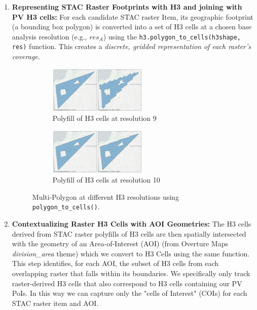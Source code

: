 \begin{enumerate}
    \item \textbf{Representing STAC Raster Footprints with H3 and joining with PV H3 cells:}
        For each candidate STAC raster Item, its geographic footprint (a bounding box polygon) is converted into a set of H3 cells at a chosen base analysis resolution (e.g., $res_A$) using the \texttt{h3.polygon\_to\_cells(h3shape, res)} function. 
        This creates a \textit{discrete, gridded representation of each raster's coverage}.

    \begin{figure}[htpb]
        \centering
        \begin{subfigure}{\textwidth}
            \centering
            \includegraphics[width=0.55\textwidth]{report/assets/figures/h3_polygonToCells_example_res9.png}
            \caption{Polyfill of H3 cells at resolution 9}
        \end{subfigure}
        
        \begin{subfigure}{\textwidth}
            \centering
            \includegraphics[width=0.55\textwidth]{report/assets/figures/h3_polygonToCells_example_res10.png}
            \caption{Polyfill of H3 cells at resolution 10}
        \end{subfigure}
        \caption{Multi-Polygon at different H3 resolutions using \texttt{polygon\_to\_cells()}.}
    \end{figure}

    \item \textbf{Contextualizing Raster H3 Cells with AOI Geometries:}
        The H3 cells derived from STAC raster polyfills of H3 cells are then spatially intersected with the geometry of an Area-of-Interest (AOI) (from Overture Maps \textit{division\_area} theme) which we convert to H3 Cells using the same function. 
        This step identifies, for each AOI, the subset of H3 cells from each overlapping raster that falls within its boundaries. We specifically only track raster-derived H3 cells that also correspond to H3 cells containing our PV PoIs. 
        In this way we can capture only the "cells of Interest" (COIs) for each STAC raster item and AOI.


\end{enumerate}
